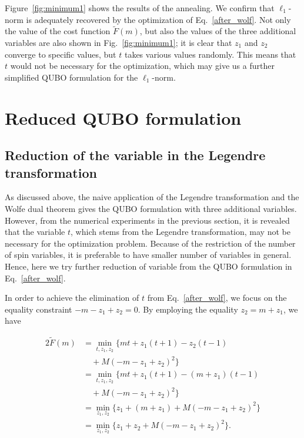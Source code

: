 \documentclass[fp,twocolumn]{jpsj3}
\begin{document}

Figure~\ref{fig:minimum1} shows the results of the annealing.
We confirm that $\ell_{1}$-norm is adequately recovered by the optimization of Eq.~\eqref{after_wolf}.
Not only the value of the cost function $\widetilde{F}(m)$, but also the values of the three additional variables are also shown in Fig.~\ref{fig:minimum1};
it is clear that $z_{1}$ and $z_{2}$ converge to specific values, but $t$ takes various values randomly. 
This means that $t$ would not be necessary for the optimization, which may give us a further simplified QUBO formulation for the $\ell_{1}$-norm.


\section{Reduced QUBO formulation} %
\subsection{Reduction of the variable in the Legendre transformation}



As discussed above, the naive application of the Legendre transformation and the Wolfe dual theorem gives the QUBO formulation with three additional variables.
However, from the numerical experiments in the previous section, it is revealed that the variable $t$, which stems from the Legendre transformation, may not be necessary for the optimization problem.
Because of the restriction of the number of spin variables, it is preferable to have smaller number of variables in general.
Hence, here we try further reduction of variable from the QUBO formulation in Eq.~\eqref{after_wolf}. 

In order to achieve the elimination of $t$ from Eq.~\eqref{after_wolf}, we focus on the equality constraint $-m-z_{1}+z_{2} = 0$.
By employing the equality $z_{2} = m+z_{1}$, we have 

\begin{alignat}{2}
  \widetilde{F}(m)&=\min_{t,z_{1},z_{2}}{\{mt+z_{1}(t+1)-z_{2}(t-1)} \nonumber \\
  &\quad+M(-m-z_{1}+z_{2})^{2}\} \nonumber \\
  &=\min_{t,z_{1},z_{2}}{\{mt+z_{1}(t+1)-(m+z_{1})(t-1)} \nonumber \\
  &\quad+M(-m-z_{1}+z_{2})^{2}\} \nonumber \\
  &=\min_{z_{1},z_{2}}{\{z_{1}+(m+z_{1})+M(-m-z_{1}+z_{2})^{2}\}} \nonumber \\
  &=\min_{z_{1},z_{2}}{\{z_{1}+z_{2}+M(-m-z_{1}+z_{2})^{2}\}}. 
\end{alignat}
\end{document}
